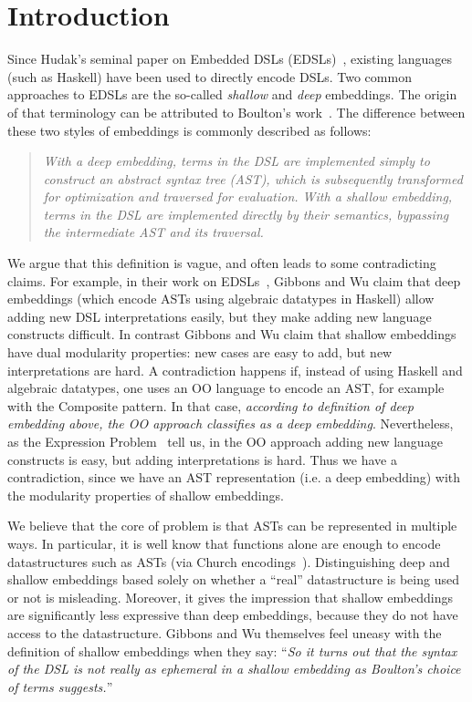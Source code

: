 \section{Introduction}

Since Hudak's seminal paper on Embedded DSLs (EDSLs)~\cite{}, existing
languages (such as Haskell) have been used to directly encode
DSLs. Two common approaches to EDSLs are the so-called \emph{shallow}
and \emph{deep} embeddings. The origin of that terminology can be
attributed to Boulton's work~\cite{}. The difference between these
two styles of embeddings is commonly described as follows:

\begin{quote}
\emph{With a deep embedding, terms in the DSL are implemented simply to
construct an abstract syntax tree (AST), which is subsequently
transformed for optimization and traversed for evaluation. With a
shallow embedding, terms in the DSL are implemented directly by
their semantics, bypassing the intermediate AST and its traversal.}\cite{gibbons15folding}
\end{quote}

We argue that this definition is vague,
and often leads to some contradicting claims. For example, in their
work on EDSLs~\cite{}, Gibbons and Wu claim that deep embeddings
(which encode ASTs using algebraic datatypes in Haskell) allow adding
new DSL interpretations easily, but they make adding new language
constructs difficult. In contrast Gibbons and Wu claim that shallow
embeddings have dual modularity properties: new cases are easy to add,
but new interpretations are hard.  A contradiction happens if, instead
of using Haskell and algebraic datatypes, one uses an OO language to
encode an AST, for example with the {\sc Composite} pattern. In that
case, \emph{according to definition of deep embedding above, the OO
  approach classifies as a deep embedding}. Nevertheless, as the
Expression Problem~\cite{} tell us, in the OO approach adding new
language constructs is easy, but adding interpretations is hard. Thus
we have a contradiction, since we have an AST representation (i.e. a
deep embedding) with the modularity properties of shallow embeddings.

We believe that the core of problem is that ASTs can be represented in
multiple ways. In particular, it is well know that functions alone are
enough to encode datastructures such as ASTs (via Church
encodings~\cite{}).  Distinguishing deep and shallow embeddings based
solely on whether a ``real'' datastructure is being used or not is
misleading.  Moreover, it gives the impression that shallow embeddings
are significantly less expressive than deep embeddings, because they
do not have access to the datastructure.
Gibbons and Wu themselves feel uneasy with the definition of shallow 
embeddings when they say:
``\emph{So it turns out that the syntax of the DSL is not really as ephemeral
in a shallow embedding as Boulton's choice of terms suggests.}''


